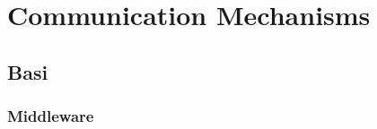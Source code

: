 \documentclass[12pt]{article}
\begin{document}
	\maketitle
	\tableofcontents
	\listoftables
	\listoffigures
	
\section{Communication Mechanisms}
	
	\subsection{Basi}
	
		\subsubsection{Middleware}
				
\end{document}
